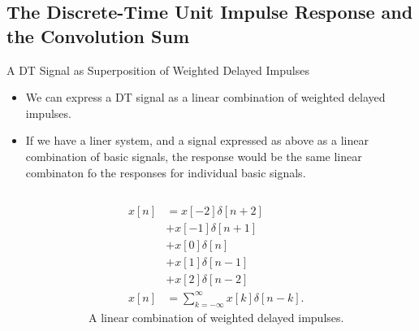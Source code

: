 \subsection{The Discrete-Time Unit Impulse Response and the Convolution Sum}

\begin{frame}{A DT Signal as  Superposition of Weighted Delayed Impulses}
    \begin{itemize}
      \item We can express a DT signal as a linear combination of weighted delayed impulses.
      \item If we have a liner system, and a signal expressed as above as a linear combination of basic signals, the response would be the same linear combinaton fo the responses for individual basic signals.
    \end{itemize}

\end{frame}


\begin{frame}[plain]
    {
        \begin{columns}
                \begin{figure}
                  \centering
                  
                  \caption{}\label{fi:dt_as_superposition}
                \end{figure}
            \begin{align*}
              x[n] &= x[-2]\delta[n+2] \\
              &  + x[-1]\delta[n+1] \\
              &  + x[0]\delta[n] \\
              &  + x[1]\delta[n-1] \\
              &  + x[2]\delta[n-2] \\
              x[n] &= \sum_{k=-\infty}^{\infty}x[k]\delta[n-k].
            \end{align*}
            A linear combination of weighted delayed impulses.
        \end{columns}
    }
\end{frame}


